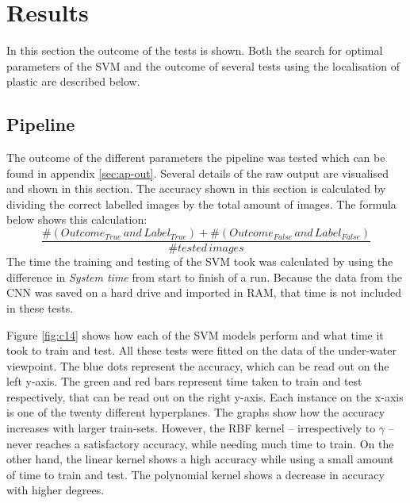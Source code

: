 \section{Results}
\label{sec:Results}
In this section the outcome of the tests is shown.
Both the search for optimal parameters of the SVM and the outcome of several tests using the localisation of plastic are described below.




\subsection{Pipeline}
\label{sec:Results-SVM}
The outcome of the different parameters the pipeline was tested which can be found in appendix \ref{sec:ap-out}.
Several details of the raw output are visualised and shown in this section.
The accuracy shown in this section is calculated by dividing the correct labelled images by the total amount of images. The formula below shows this calculation:
{\small \[
\frac{\#(Outcome_{True}\,and\,Label_{True})+\#(Outcome_{False}\,and\,Label_{False})}{\#tested\,images}
\]}
\indent The time the training and testing of the SVM took was calculated by using the difference in \textit{System time} from start to finish of a run.
Because the data from the CNN was saved on a hard drive and imported in RAM, that time is not included in these tests.

Figure \ref{fig:c14} shows how each of the SVM models perform and what time it took to train and test.
All these tests were fitted on the data of the under-water viewpoint.
The blue dots represent the accuracy, which can be read out on the left y-axis.
The green and red bars represent time taken to train and test respectively, that can be read out on the right y-axis.
Each instance on the x-axis is one of the twenty different hyperplanes.
The graphs show how the accuracy increases with larger train-sets. However, the RBF kernel -- irrespectively to $\gamma$ -- never reaches a satisfactory accuracy, while needing much time to train. On the other hand, the linear kernel shows a high accuracy while using a small amount of time to train and test. The polynomial kernel shows a decrease in accuracy with higher degrees.

